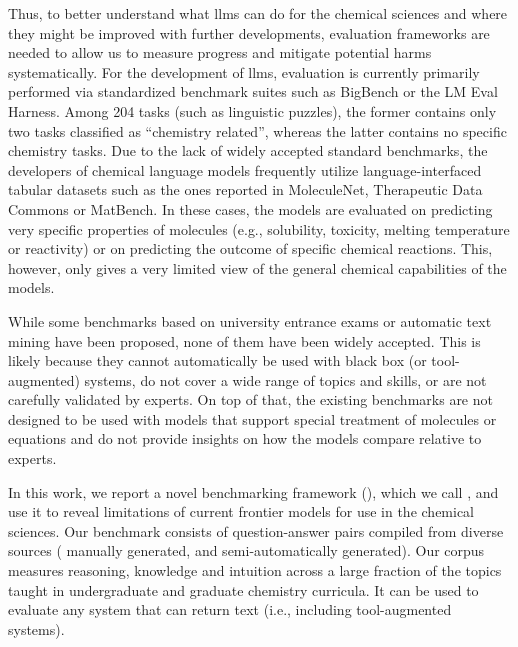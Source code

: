 \documentclass[11pt, oneside]{article}
\begin{document}
\begin{refsection}
Thus, to better understand what \glspl{llm} can do for the chemical sciences and where they might be improved with further developments, evaluation frameworks are needed to allow us to measure progress and mitigate potential harms systematically.
For the development of \glspl{llm}, evaluation is currently primarily performed via standardized benchmark suites such as BigBench\autocite{srivastava2022beyond} or the LM Eval Harness.\autocite{eval-harness}
Among 204 tasks (such as linguistic puzzles), the former contains only two tasks classified as \enquote{chemistry related}, whereas the latter contains no specific chemistry tasks.
Due to the lack of widely accepted standard benchmarks, the developers of chemical language models\autocite{jablonka2024leveraging, guo2023large, ahmad2022chemberta2, Cai_2024, frey2023neural} frequently utilize language-interfaced\autocite{dinh2022lift} tabular datasets such as the ones reported in MoleculeNet,\autocite{wu2018moleculenet} Therapeutic Data Commons\autocite{huang2021therapeutics} or MatBench.\autocite{Dunn_2020}
In these cases, the models are evaluated on predicting very specific properties of molecules (e.g., solubility, toxicity, melting temperature or reactivity) or on predicting the outcome of specific chemical reactions.
This, however, only gives a very limited view of the general chemical capabilities of the models.

While some benchmarks based on university entrance exams\autocite{Zaki_2024, arora2023llms} or automatic text mining\autocite{song2023honeybee, wei2021chemistryqa, song-etal-2023-matsci} have been proposed, none of them have been widely accepted.
This is likely because they cannot automatically be used with black box (or tool-augmented) systems, do not cover a wide range of topics and skills, or are not carefully validated by experts.
On top of that, the existing benchmarks are not designed to be used with models that support special treatment of molecules or equations and do not provide insights on how the models compare relative to experts.

In this work, we report a novel benchmarking framework  (), which we call \chembench, and use it to reveal limitations of current frontier models for use in the chemical sciences.
Our benchmark consists of \xspace question-answer pairs compiled from diverse sources (\xspace manually generated, and \xspace semi-automatically generated).
Our corpus measures reasoning, knowledge and intuition across a large fraction of the topics taught in undergraduate and graduate chemistry curricula. It can be used to evaluate any system that can return text (i.e., including tool-augmented systems).


\end{refsection}
\end{document}
